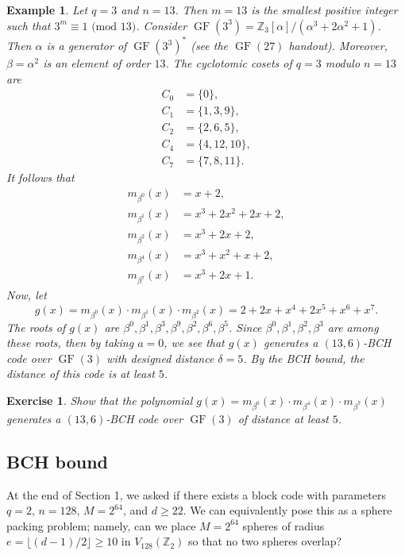 \documentclass[10pt]{article}
\newcommand{\Z}{\mathbb{Z}}
\DeclareMathOperator{\GF}{GF}
\theoremstyle{newstyle}
\newtheorem{exercise}[thm]{Exercise}
\newtheorem{exmp}[thm]{Example}
\begin{document}
\begin{exmp}
Let $q = 3$ and $n = 13$. Then $m = 13$ is the smallest positive integer such that $3^m \equiv 1 
\text{ (mod 13)}$. Consider $\GF(3^3) = \Z_3[\alpha]/(\alpha^3+2\alpha^2+1)$. Then 
$\alpha$ is a generator of $\GF(3^3)^*$ (see the $\GF(27)$ handout). Moreover, $\beta = \alpha^2$ 
is an element of order $13$. The cyclotomic cosets of $q = 3$ modulo $n = 13$ are 
\begin{align*}
    C_0 &= \{0\}, \\
    C_1 &= \{1, 3, 9\}, \\
    C_2 &= \{2, 6, 5\}, \\
    C_4 &= \{4, 12, 10\}, \\
    C_7 &= \{7, 8, 11\}. 
\end{align*}
It follows that 
\begin{align*}
    m_{\beta^0}(x) &= x+2, \\
    m_{\beta^1}(x) &= x^3 + 2x^2 + 2x + 2, \\
    m_{\beta^2}(x) &= x^3 + 2x + 2, \\
    m_{\beta^4}(x) &= x^3 + x^2 + x + 2, \\
    m_{\beta^7}(x) &= x^3 + 2x + 1.
\end{align*}
Now, let 
\[ g(x) = m_{\beta^0}(x) \cdot m_{\beta^1}(x) \cdot m_{\beta^2}(x) = 2 + 2x + x^4 + 2x^5 + x^6 + x^7. \] 
The roots of $g(x)$ are $\beta^0, \beta^1, \beta^3, \beta^9, \beta^2, \beta^6, \beta^5$. 
Since $\beta^0, \beta^1, \beta^2, \beta^3$ are among these roots, then by taking $a = 0$, 
we see that $g(x)$ generates a $(13, 6)$-BCH code over $\GF(3)$ with designed distance $\delta = 5$. 
By the BCH bound, the distance of this code is at least $5$. 
\end{exmp}

\begin{exercise}
Show that the polynomial $g(x) = m_{\beta^0}(x) \cdot m_{\beta^4}(x) \cdot m_{\beta^7}(x)$ generates a 
$(13, 6)$-BCH code over $\GF(3)$ of distance at least $5$. 
\end{exercise}

\subsection{BCH bound}

At the end of Section 1, we asked if there exists a block code with parameters $q = 2$, 
$n = 128$, $M = 2^{64}$, and $d \geq 22$. We can equivalently pose this as a sphere packing problem; 
namely, can we place $M = 2^{64}$ spheres of radius $e = \lfloor (d-1)/2 \rfloor \geq 10$ 
in $V_{128}(\Z_2)$ so that no two spheres overlap?
\end{document}
